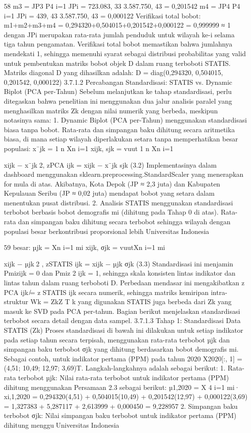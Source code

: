 58
m3 =
JP3
P4
i=1 JPi
=
723.083, 33
3.587.750, 43
= 0,201542
m4 =
JP4
P4
i=1 JPi
=
439, 43
3.587.750, 43
= 0,000122
Verifikasi total bobot: m1+m2+m3+m4 = 0,294320+0,504015+0,201542+0,000122 =
0,999999 ≈ 1 dengan JPi merupakan rata-rata jumlah penduduk untuk wilayah ke-i
selama tiga tahun pengamatan. Verifikasi total bobot memastikan bahwa jumlahnya
mendekati 1, sehingga memenuhi syarat sebagai distribusi probabilitas yang valid untuk
pembentukan matriks bobot objek D dalam ruang terboboti STATIS.
Matriks diagonal D yang dihasilkan adalah:
D = diag(0,294320, 0,504015, 0,201542, 0,000122)
3.7.1.2 Percabangan Standardisasi: STATIS vs. Dynamic Biplot (PCA per-Tahun)
Sebelum melanjutkan ke tahap standardisasi, perlu ditegaskan bahwa penelitian ini
menggunakan dua jalur analisis paralel yang menghasilkan matriks Zk dengan nilai
numerik yang berbeda, meskipun notasinya sama:
1. Dynamic Biplot (PCA per-Tahun) menggunakan standardisasi biasa tanpa bobot.
Rata-rata dan simpangan baku dihitung secara aritmetika biasa, di mana setiap
wilayah diperlakukan setara tanpa memperhatikan besar populasi:
x¯jk =
1
n
Xn
i=1
xijk, sjk =
vuut
1
n
Xn
i=1

xijk − x¯jk2, zPCA
ijk =
xijk − x¯jk
sjk
(3.2)
Implementasinya dalam dashboard menggunakan
sklearn.preprocessing.StandardScaler yang menerapkan formula di atas. Akibatnya, Kota Depok (JP ≈ 2,3 juta) dan Kabupaten Kepulauan
Seribu (JP ≈ 0,02 juta) mendapat bobot yang setara dalam menentukan pusat
distribusi.
2. Analisis STATIS menggunakan standardisasi terbobot berbasis bobot demografis
mi (dihitung pada Tahap 0 di atas). Rata-rata dan simpangan baku dihitung secara
terbobot sehingga wilayah dengan populasi besar berkontribusi proporsional lebih
Universitas Indonesia

59
besar:
µjk =
Xn
i=1
mi xijk, σjk =
vuutXn
i=1
mi

xijk − µjk2
, zSTATIS
ijk =
xijk − µjk
σjk
(3.3)
Standardisasi ini menjamin Pmizijk = 0 dan Pmiz
2
ijk = 1, sehingga skala
konsisten lintas indikator dan lintas tahun dalam ruang terboboti D.
Perbedaan mendasar ini mengakibatkan z
PCA
ijk ̸= z
STATIS
ijk secara numerik, sehingga
matriks kemiripan intra-struktur Wk = ZkZ
T
k
yang digunakan STATIS juga berbeda dari
Zk yang masuk ke SVD pada PCA per-tahun. Bagian berikut menjelaskan standardisasi
terbobot secara detail dengan data sampel.
3.7.1.3 Tahap 1: Standardisasi Data STATIS (Zk)
Proses standardisasi di bawah ini dilakukan untuk setiap indikator pada setiap tahun
secara terpisah, menggunakan rata-rata terbobot µjk dan simpangan baku terbobot σjk
yang dihitung berdasarkan bobot demografis mi. Sebagai contoh, untuk indikator pertama
(PPM) pada tahun 2020 X2020[:, 1] = (4,51; 10,49; 12,97; 3,69)T. Langkah-langkahnya
adalah sebagai berikut:
1. Rata-rata terbobot µjk:
Nilai rata-rata terbobot untuk indikator pertama (PPM) dihitung menggunakan
Persamaan 2.3 sebagai berikut:
µ1,2020 =
X
4
i=1
mi· xi,1,2020
= 0,294320(4,51) + 0,504015(10,49)
+ 0,201542(12,97) + 0,000122(3,69)
= 1,327383 + 5,287117 + 2,613999 + 0,000450 = 9,228957
2. Simpangan baku terbobot σjk:
Nilai simpangan baku terbobot untuk indikator pertama (PPM) dihitung mengguUniversitas Indonesia

